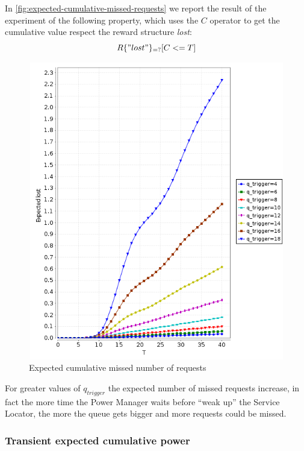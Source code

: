 In \autoref{fig:expected-cumulative-missed-requests} we report the
result of the experiment of the following property, which uses the $C$
operator to get the cumulative value respect the reward structure
\emph{lost}:
\begin{displaymath}
  R\{"lost"\}_{=?} [ C<=T ]
\end{displaymath}
\begin{figure}[htb]
  \centering
  \includegraphics[width=13cm,
  height=13cm]{quantitative-project/expected-missed-requests.png}
  \caption{Expected cumulative missed number of requests}
  \label{fig:expected-cumulative-missed-requests}
\end{figure}
For greater values of $q_{trigger}$ the expected number of missed
requests increase, in fact the more time the Power Manager waits
before ``weak up'' the Service Locator, the more the queue gets bigger
and more requests could be missed.

\subsubsection{Transient expected cumulative power }

